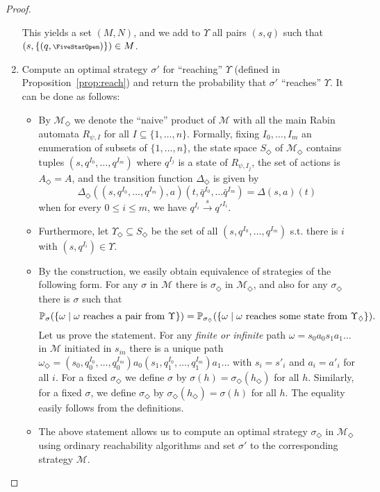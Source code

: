\documentclass[a4paper,UKenglish]{lipics}
\newcommand{\symbopen}{\text{\scriptsize\FiveStarOpen}}
\newcommand{\tran}[1]{\stackrel{#1}{\rightarrow}}
\newcommand{\mdp}{\mathcal{M}}
\newcommand{\states}{S}
\newcommand{\actions}{A}
\newcommand{\tra}{\Delta}
\renewcommand{\Pr}[3][]{\ifblank{#1}{\mathbb{P}_{#2}}{\mathbb{P}^{#1}_{#2}}(#3)}
\newcommand{\rabin}{R}
\newcommand{\sinit}{s_{in}}
\begin{document}
\begin{proof}
\begin{enumerate}
\begin{itemize}
		\end{itemize}
		This yields a set $(M,N)$, and we add to $\Upsilon$ all pairs $(s,q)$ such that
		$(s,\{(q,\symbopen)\}) \in M$.
\item Compute an optimal strategy $\sigma'$ for ``reaching'' $\Upsilon$ (defined in Proposition~\ref{prop:reach}) and return the probability that $\sigma'$ ``reaches'' $\Upsilon$. It can be done as follows:
		\begin{itemize}
			\item By $\mdp_\Diamond$ we denote the ``naive'' product of $\mdp$ with all the main Rabin automata $\rabin_{\psi,I}$
			for all $I\subseteq \{1,\ldots,n\}$. Formally, fixing $I_0,\ldots, I_m$ an enumeration of subsets of $\{1,\ldots,n\}$,
			the state space $\states_\Diamond$ of $\mdp_\Diamond$ contains tuples
			$(s,q^{I_0},\ldots,q^{I_m})$ where $q^{I_j}$ is a state of $\rabin_{\psi,I_j}$,
			the set of actions is $\actions_\Diamond = \actions$, and the transition function $\tra_\Diamond$
			is given by
			\[
			\tra_\Diamond((s,q^{I_0},\ldots, q^{I_m}),a)(t,\bar q^{I_0},\ldots \bar q^{I_m}) = \tra(s,a)(t)
			\]
			when for every $0 \leq i \leq m$, we have $q^{I_i}\tran{s} q'^{I_i}$.
			
			\item Furthermore, let $\Upsilon_\Diamond\subseteq S_\Diamond$ be the set of all $(s,q^{I_0},\ldots,q^{I_m})$ s.t.
			there is $i$ with $(s,q^{I_i})\in \Upsilon$.
			
			\item By the construction, we easily obtain equivalence of strategies of the following form.
For any $\sigma$ in $\mdp$ there is $\sigma_\Diamond$ in $\mdp_\Diamond$, and also for any $\sigma_\Diamond$ there is $\sigma$ such that 
			$$\Pr{\sigma}{\{ \omega \mid \text{$\omega$ reaches a pair from $\Upsilon$} \}} = \Pr{\sigma_\Diamond}{\{ \omega \mid \text{$\omega$ reaches some state from $\Upsilon_\Diamond$} \}}.$$
Let us prove the statement. For any \emph{finite or infinite} path $\omega=s_0a_0s_1a_1\ldots$ in $\mdp$ initiated in $\sinit$
			there is a unique path $\omega_\Diamond = (s_0,q_0^{I_0},\ldots, q_0^{I_m})a_0(s_1,q_1^{I_0},\ldots, q_1^{I_m})a_1\ldots$ with $s_i = s'_i$ and $a_i=a'_i$ for all $i$. 
For a fixed $\sigma_\Diamond$ we define $\sigma$ by $\sigma(h) = \sigma_\Diamond(h_\Diamond)$ for all $h$.
			Similarly, for a fixed $\sigma$, we define $\sigma_\Diamond$ by $\sigma_\Diamond(h_\Diamond) = \sigma(h)$ for all $h$.
The equality easily follows from the definitions.
			
			\item The above statement allows us to compute an optimal strategy $\sigma_\Diamond$ in $\mdp_\Diamond$ using ordinary reachability algorithms and set $\sigma'$ to the corresponding strategy $\mdp$.
		\end{itemize}
\end{enumerate}
	

\end{proof}
\end{document}
